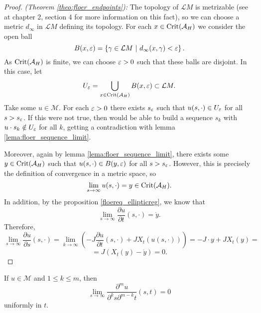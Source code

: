 \begin{proof} {\it (Theorem \ref{theo:floer_endpoints}):} The topology of $\mathcal{L}M$ is metrizable (see \cite{hirsch2012differential} at chapter 2, section 4 for more information on this fact), so we can choose a metric $d_{\infty}$ in $\mathcal{L}M$ defining its topology. For each $x \in \mathrm{Crit}(\mathcal{A}_H)$ we consider the open ball
\[B(x,\e) = \left\{ \gamma \in \mathcal{L}M \ | \ d_{\infty}(x,\gamma) < \e \right\} .\]
As  $\mathrm{Crit}(\mathcal{A}_H)$ is finite, we can choose $\varepsilon > 0$ such that these balls are disjoint. In this case, let
\[U_{\varepsilon} = \bigcup_{x \in \mathrm{Crit}(\mathcal{A}_H)} B(x,\varepsilon) \subset \mathcal{L}M .\]
Take some $u \in \mathcal{M}$. For each $\varepsilon > 0$ there exists $s_{\varepsilon}$ such that $u(s,\cdot) \in U_{\varepsilon}$ for all $s > s_{\varepsilon}$. If this were not true, then would be able to build a sequence $s_k$ with $u \cdot s_k \notin U_{\varepsilon}$ for all $k$, getting a contradiction with lemma \ref{lema:floer_sequence_limit}.

Moreover, again by lemma \ref{lema:floer_sequence_limit}, there exists some $y \in \mathrm{Crit}(\mathcal{A}_H)$ such that $u(s,\cdot) \in B(y,\varepsilon)$ for all $s > s_{\varepsilon}$. However, this is precisely the definition of convergence in a metric space, so
\[\lim_{s \rightarrow \infty} u(s,\cdot) = y \in \mathrm{Crit}(\mathcal{A}_H) .\]
In addition, by the proposition \ref{floereq_ellipticreg}, we know that
\[\lim_{s\rightarrow\infty} \frac{\partial u}{\partial t}(s,\cdot) = \dot{y} .\]
Therefore,
\[\lim_{s\rightarrow\infty} \frac{\partial u}{\partial s}(s,\cdot) = \lim_{k\rightarrow\infty} \left( - J \frac{\partial u}{\partial t}(s,\cdot) + JX_t(u(s,\cdot)) \right) = -J\cdot{y} + JX_t(y) =\]
\[= J(X_t(y) - \dot{y}) = 0 .\]
\end{proof}

\begin{coro} If $u \in \mathcal{M}$ and $1 \leq k \leq m$, then
\[\lim_{s\rightarrow\infty} \frac{\partial^m u}{\partial^k s \partial^{m-k} t}(s,t) = 0\]
uniformly in $t$.
\end{coro}

